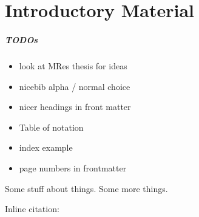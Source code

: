 

\chapter{Introductory Material}
\label{chapterlabel1}

\paragraph{TODOs}

\begin{itemize}
	\item look at MRes thesis for ideas
	\item nicebib alpha / normal choice
	\item nicer headings in front matter
	\item Table of notation
	\item index example
	\item page numbers in frontmatter
\end{itemize}
Some stuff about things.\cite{example-citation} Some more things. 

Inline citation: 

